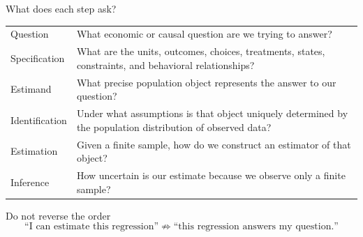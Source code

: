 \documentclass[aspectratio=169,11pt]{beamer}
\begin{document}
\begin{frame}{What does each step ask?}

\small

\begin{tabular}{B{0.19\textwidth} L{0.72\textwidth}}
\toprule
Question
&
What economic or causal question are we trying to answer?
\\[0.5em]

Specification
&
What are the units, outcomes, choices, treatments, states,
constraints, and behavioral relationships?
\\[0.5em]

Estimand
&
What precise population object represents the answer to our question?
\\[0.5em]

Identification
&
Under what assumptions is that object uniquely determined by the
population distribution of observed data?
\\[0.5em]

Estimation
&
Given a finite sample, how do we construct an estimator of that object?
\\[0.5em]

Inference
&
How uncertain is our estimate because we observe only a finite sample?
\\
\bottomrule
\end{tabular}

\vspace{0.4em}

\begin{alertblock}{Do not reverse the order}
\[
\boxed{
\text{``I can estimate this regression''}
\;\not\Rightarrow\;
\text{``this regression answers my question.''}
}
\]
\end{alertblock}

\end{frame}
\end{document}
